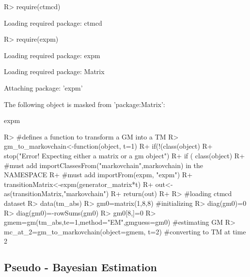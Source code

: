 \documentclass[
  nojss]{jss}
\begin{document}
\begin{CodeChunk}

\begin{CodeInput}
R> require(ctmcd)
\end{CodeInput}

\begin{CodeOutput}
Loading required package: ctmcd
\end{CodeOutput}

\begin{CodeInput}
R> require(expm)
\end{CodeInput}

\begin{CodeOutput}
Loading required package: expm
\end{CodeOutput}

\begin{CodeOutput}
Loading required package: Matrix
\end{CodeOutput}

\begin{CodeOutput}

Attaching package: 'expm'
\end{CodeOutput}

\begin{CodeOutput}
The following object is masked from 'package:Matrix':

    expm
\end{CodeOutput}

\begin{CodeInput}
R> #defines a function to transform a GM into a TM
R> gm_to_markovchain<-function(object, t=1) {
R+   if(!(class(object) %
R+     stop("Error! Expecting either a matrix or a gm object")
R+   if ( class(object) %
R+   #must add importClassesFrom("markovchain",markovchain) in the NAMESPACE
R+   #must add importFrom(expm, "expm")
R+   transitionMatrix<-expm(generator_matrix*t)
R+   out<-as(transitionMatrix,"markovchain")
R+   return(out)
R+ }
R> #loading ctmcd dataset
R> data(tm_abs)
R> gm0=matrix(1,8,8) #initializing
R> diag(gm0)=0
R> diag(gm0)=-rowSums(gm0)
R> gm0[8,]=0
R> gmem=gm(tm_abs,te=1,method="EM",gmguess=gm0) #estimating GM
R> mc_at_2=gm_to_markovchain(object=gmem, t=2) #converting to TM at time 2
\end{CodeInput}
\end{CodeChunk}

\hypertarget{pseudo---bayesian-estimation}{%
\subsection{Pseudo - Bayesian Estimation}\label{pseudo---bayesian-estimation}}
\end{document}
